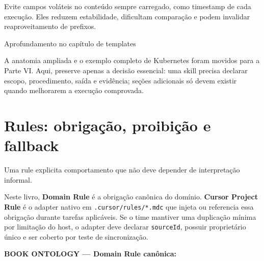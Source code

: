 \documentclass[
  10pt,
  a4paper,
  oneside]{book}
\begin{document}
Evite campos voláteis no conteúdo sempre carregado, como timestamp de
cada execução. Eles reduzem estabilidade, dificultam comparação e podem
invalidar reaproveitamento de prefixos.

\begin{tipbox}{Aprofundamento no capítulo de templates}

A anatomia ampliada e o exemplo completo de Kubernetes foram movidos
para a Parte VI. Aqui, preserve apenas a decisão essencial: uma skill
precisa declarar escopo, procedimento, saída e evidência; seções
adicionais só devem existir quando melhorarem a execução comprovada.

\end{tipbox}

\hypertarget{rules-obrigauxe7uxe3o-proibiuxe7uxe3o-e-fallback}{%
\section{Rules: obrigação, proibição e
fallback}\label{rules-obrigauxe7uxe3o-proibiuxe7uxe3o-e-fallback}}

Uma rule explicita comportamento que não deve depender de interpretação
informal.

Neste livro, \textbf{Domain Rule} é a obrigação canônica do domínio.
\textbf{Cursor Project Rule} é o adapter nativo em
\texttt{.cursor/rules/*.mdc} que injeta ou referencia essa obrigação
durante tarefas aplicáveis. Se o time mantiver uma duplicação mínima por
limitação do host, o adapter deve declarar \texttt{sourceId}, possuir
proprietário único e ser coberto por teste de sincronização.

\textbf{BOOK ONTOLOGY --- Domain Rule canônica:}
\end{document}

